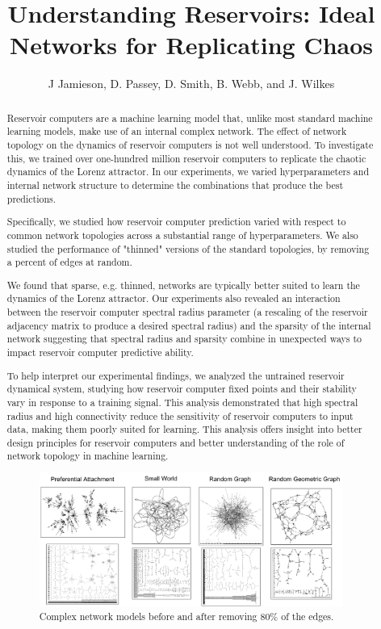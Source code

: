 \documentclass[12pt]{article}
\begin{document}
\title{\normalsize\bf%
Understanding Reservoirs: Ideal Networks for Replicating Chaos}

\author{J Jamieson, D. Passey, D. Smith,  B. Webb, and J. Wilkes\\
}

\date{\vspace{-5ex}} %

\maketitle

\thispagestyle{empty}
\pagestyle{empty}


\begin{abstract}\normalsize
Reservoir computers are a machine learning model that, unlike most standard machine learning models, make use of an internal complex network. The effect of network topology on the dynamics of reservoir computers is not well understood. To investigate this, we trained over one-hundred million reservoir computers to replicate the chaotic dynamics of the Lorenz attractor. In our experiments, we varied hyperparameters and internal network structure to determine the combinations that produce the best predictions.

Specifically, we studied how reservoir computer prediction varied with respect to common network topologies across a substantial range of hyperparameters. We also studied the performance of "thinned" versions of the standard topologies, by removing a percent of edges at random.

We found that sparse, e.g. thinned, networks are typically better suited to learn the dynamics of the Lorenz attractor. Our experiments also revealed an interaction between the reservoir computer spectral radius parameter (a rescaling of the reservoir adjacency matrix to produce a desired spectral radius) and the sparsity of the internal network suggesting that spectral radius and sparsity combine in unexpected ways to impact reservoir computer predictive ability.

To help interpret our experimental findings, we analyzed the untrained reservoir dynamical system, studying how reservoir computer fixed points and their stability vary in response to a training signal. This analysis demonstrated that high spectral radius and high connectivity reduce the sensitivity of reservoir computers to input data, making them poorly suited for learning. This analysis offers insight into better design principles for reservoir computers and better understanding of the role of network topology in machine learning.

\begin{figure}[h]
\centering
\includegraphics[width=.6\columnwidth]{networkthinning.png}
\caption{Complex network models before and after removing 80\% of the edges.}
\label{fig:nets}
\end{figure}

\end{abstract}
\end{document}
